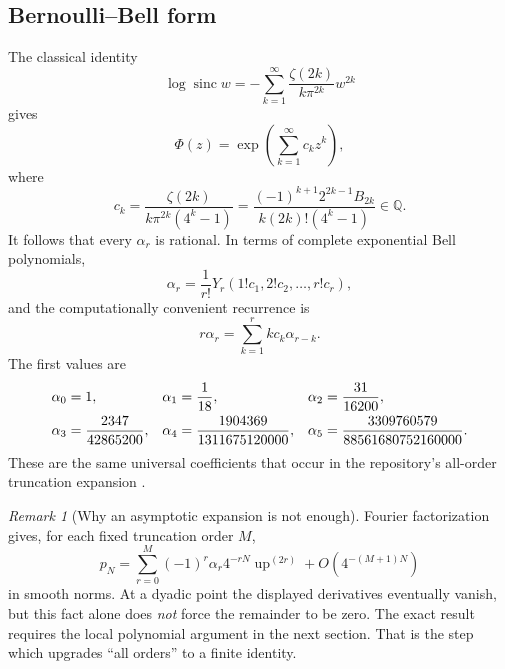\documentclass[11pt]{article}
\theoremstyle{definition}
\theoremstyle{remark}
\newtheorem{remark}[remark]{Remark}
\newcommand{\Q}{\mathbb Q}
\newcommand{\sinc}{\operatorname{sinc}}
\newcommand{\rv}{\operatorname{up}}
\begin{document}
\subsection{Bernoulli--Bell form}

The classical identity
\begin{equation}
 \log\sinc w=-\sum_{k=1}^{\infty}
 \frac{\zeta(2k)}{k\pi^{2k}}w^{2k}
 \label{eq:log-sinc}
\end{equation}
gives
\begin{equation}
 \Phi(z)=\exp\!\left(\sum_{k=1}^{\infty}c_kz^k\right),
 \label{eq:Phi-cumulants}
\end{equation}
where
\begin{equation}
 c_k=\frac{\zeta(2k)}{k\pi^{2k}(4^k-1)}
 =\frac{(-1)^{k+1}2^{2k-1}B_{2k}}
 {k(2k)!(4^k-1)}\in\Q.
 \label{eq:ck}
\end{equation}
It follows that every \(\alpha_r\) is rational.  In terms of complete
exponential Bell polynomials,
\begin{equation}
 \alpha_r=\frac{1}{r!}
 Y_r(1!c_1,2!c_2,\ldots,r!c_r),
 \label{eq:alpha-bell}
\end{equation}
and the computationally convenient recurrence is
\begin{equation}
 r\alpha_r=\sum_{k=1}^{r}k c_k\alpha_{r-k}.
 \label{eq:alpha-recurrence}
\end{equation}
The first values are
\begin{align}
 \alpha_0&=1,&
 \alpha_1&=\frac1{18},&
 \alpha_2&=\frac{31}{16200},\notag\\
 \alpha_3&=\frac{2347}{42865200},&
 \alpha_4&=\frac{1904369}{1311675120000},&
 \alpha_5&=\frac{3309760579}{88561680752160000}.
 \label{eq:first-alphas}
\end{align}
These are the same universal coefficients that occur in the repository's
all-order truncation expansion \cite{proveit-frontiers}.

\begin{remark}[Why an asymptotic expansion is not enough]
Fourier factorization gives, for each fixed truncation order \(M\),
\[
 p_N=\sum_{r=0}^{M}(-1)^r\alpha_r4^{-rN}\rv^{(2r)}
      +O(4^{-(M+1)N})
\]
in smooth norms.  At a dyadic point the displayed derivatives eventually
vanish, but this fact alone does \emph{not} force the remainder to be zero.
The exact result requires the local polynomial argument in the next section.
That is the step which upgrades ``all orders'' to a finite identity.
\end{remark}
\end{document}
